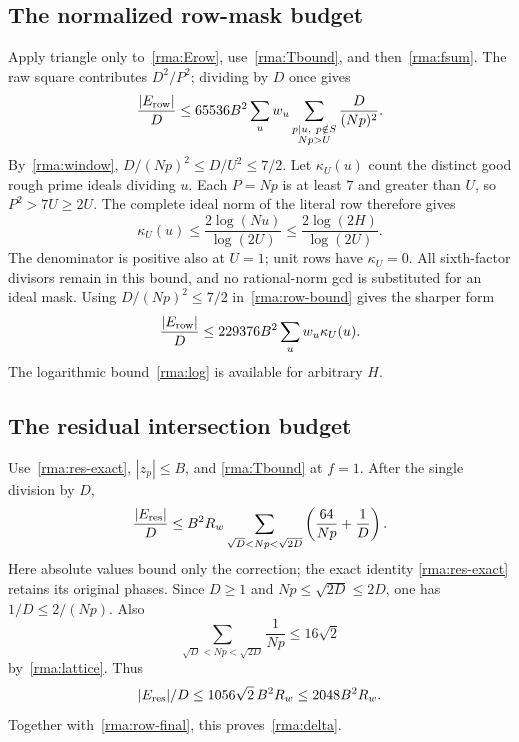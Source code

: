 \documentclass[11pt]{article}
\theoremstyle{definition}\newtheorem{definition}[theorem]{Definition}
\theoremstyle{remark}\newtheorem{remark}[theorem]{Remark}
\begin{document}
\subsection{The normalized row-mask budget}
Apply triangle only to~\eqref{rma:Erow}, use~\eqref{rma:Tbound},
and then~\eqref{rma:fsum}. The raw square contributes
$D^2/P^2$; dividing by $D$ once gives
\begin{equation}\label{rma:row-bound}
 \frac{|E_{\rm row}|}{D}
 \le65536B^2
       \sum_u w_u\sum_{\substack{p\mid u,\ p\notin S\\Np>U}}
                                      \frac{D}{(Np)^2}.
\end{equation}
By~\eqref{rma:window}, $D/(Np)^2\le D/U^2\le7/2$.
Let $\kappa_U(u)$ count the distinct good rough prime ideals dividing $u$.
Each $P=Np$ is at least $7$ and greater than $U$, so $P^2>7U\ge2U$.
The complete ideal norm of the literal row therefore gives
\begin{equation}\label{rma:log}
 \kappa_U(u)\le\frac{2\log(Nu)}{\log(2U)}
          \le\frac{2\log(2H)}{\log(2U)}.
\end{equation}
The denominator is positive also at $U=1$; unit rows have $\kappa_U=0$.
All sixth-factor divisors remain in this bound, and no rational-norm gcd
is substituted for an ideal mask. Using $D/(Np)^2\le7/2$ in~\eqref{rma:row-bound} gives the sharper form
\begin{equation}\label{rma:row-final}
 \frac{|E_{\rm row}|}{D}\le229376B^2
                              \sum_u w_u\kappa_U(u).
\end{equation}
The logarithmic bound~\eqref{rma:log} is available for arbitrary $H$.

\subsection{The residual intersection budget}
Use~\eqref{rma:res-exact}, $|z_p|\le B$, and
\eqref{rma:Tbound} at $f=1$. After the single division by $D$,
\begin{equation}\label{rma:res-bound}
 \frac{|E_{\rm res}|}{D}
 \le B^2R_w\sum_{\sqrt D<Np<\sqrt{2D}}
       \left(\frac{64}{Np}+\frac1D\right).
\end{equation}
Here absolute values bound only the correction; the exact identity
\eqref{rma:res-exact} retains its original phases. Since $D\ge1$ and
$Np\le\sqrt{2D}\le2D$, one has $1/D\le2/(Np)$. Also
\begin{equation}\label{rma:reciprocal}
 \sum_{\sqrt D<Np<\sqrt{2D}}\frac1{Np}\le16\sqrt2
\end{equation}
by~\eqref{rma:lattice}. Thus
\[
 |E_{\rm res}|/D\le1056\sqrt2\,B^2R_w\le2048B^2R_w.
\]
Together with~\eqref{rma:row-final}, this proves~\eqref{rma:delta}.
\end{document}
